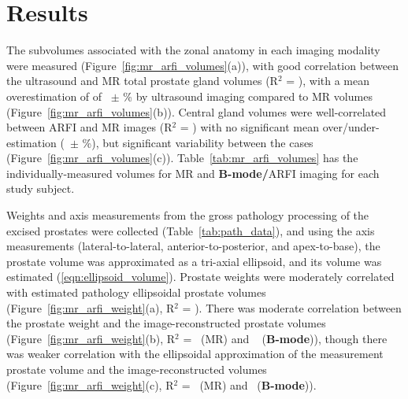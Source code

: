\section{Results}\label{sect:results}
The subvolumes associated with the zonal anatomy in each imaging modality were
measured (Figure~\ref{fig:mr_arfi_volumes}(a)), with good correlation between
the ultrasound and MR total prostate gland volumes (R$^2$ =
\MRarfiVolTotalRsq), with a mean overestimation of of
\MRarfiVolTotalMeanDiff~$\pm$ \MRarfiVolTotalStdDiff\% by ultrasound imaging
compared to MR volumes (Figure~\ref{fig:mr_arfi_volumes}(b)).  Central gland
volumes were well-correlated between ARFI and MR images (R$^2$ =
\MRarfiVolCentralRsq) with no significant mean over/under-estimation
(\MRarfiVolCentralMeanDiff~$\pm$ \MRarfiVolCentralStdDiff\%), but significant
variability between the cases (Figure~\ref{fig:mr_arfi_volumes}(c)).
Table~\ref{tab:mr_arfi_volumes} has the individually-measured volumes for MR
and \textbf{B-mode/}ARFI imaging for each study subject.



Weights and axis measurements from the gross pathology processing of the
excised prostates were collected (Table~\ref{tab:path_data}), and using the
axis measurements (lateral-to-lateral, anterior-to-posterior, and
apex-to-base), the prostate volume was approximated as a tri-axial ellipsoid,
and its volume was estimated (\ref{eqn:ellipsoid_volume}).  Prostate weights
were moderately correlated with estimated pathology ellipsoidal prostate
volumes (Figure~\ref{fig:mr_arfi_weight}(a), R$^2$ = \pathVolWeightRsq).  There
was moderate correlation between the prostate weight and the
image-reconstructed prostate volumes (Figure~\ref{fig:mr_arfi_weight}(b), R$^2$
= \weightMRrsq~(MR) and \weightARFIrsq~ (\textbf{B-mode})), though there was weaker
correlation with the ellipsoidal approximation of the measurement prostate
volume and the image-reconstructed volumes (Figure~\ref{fig:mr_arfi_weight}(c),
R$^2$ = \pathVolMRrsq~(MR) and \pathVolARFIrsq~(\textbf{B-mode})).  



